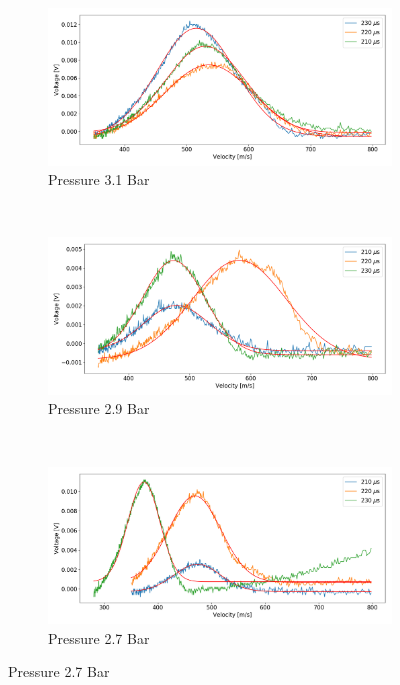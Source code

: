 \documentclass[a4paper,10pt]{article}
\begin{document}
\begin{figure}[H]
  \centering{}
  \begin{subfigure}[t]{0.45 \textwidth}
    \centering
    \includegraphics[width= \textwidth]{tof21}
    \caption{Pressure 3.1 Bar}\label{tof1}
  \end{subfigure}
  ~
  \begin{subfigure}[t]{0.45 \textwidth}
    \centering
    \includegraphics[width=\textwidth]{tof19}
    \caption{Pressure 2.9 Bar}\label{tof2}
  \end{subfigure}
  ~
  \begin{subfigure}[t]{0.45 \textwidth}
    \centering
    \includegraphics[width=\textwidth]{tof17}
    \caption{Pressure 2.7 Bar}\label{tof3}
  \end{subfigure}

\end{figure}
\end{document}
